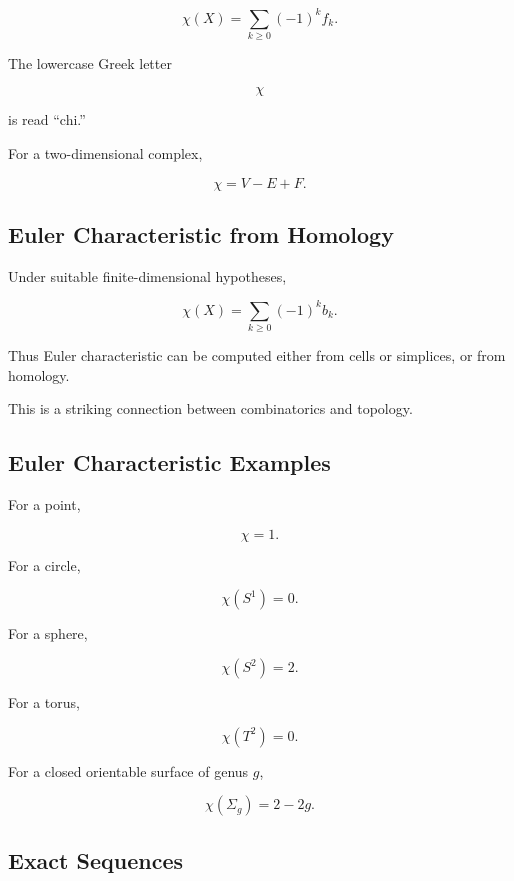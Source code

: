 \[
\boxed{
\chi(X)
=
\sum_{k\geq0}
(-1)^k f_k.
}
\]

The lowercase Greek letter

\[
\chi
\]

is read ``chi.''

For a two-dimensional complex,

\[
\boxed{
\chi
=
V-E+F.
}
\]

\subsection{Euler Characteristic from Homology}
\label{subsec:euler-characteristic-homology}

Under suitable finite-dimensional hypotheses,

\[
\boxed{
\chi(X)
=
\sum_{k\geq0}
(-1)^k b_k.
}
\]

Thus Euler characteristic can be computed either from cells or simplices,
or from homology.

This is a striking connection between combinatorics and topology.

\subsection{Euler Characteristic Examples}
\label{subsec:euler-characteristic-examples}

For a point,

\[
\boxed{
\chi=1.
}
\]

For a circle,

\[
\boxed{
\chi(S^1)=0.
}
\]

For a sphere,

\[
\boxed{
\chi(S^2)=2.
}
\]

For a torus,

\[
\boxed{
\chi(T^2)=0.
}
\]

For a closed orientable surface of genus \(g\),

\[
\boxed{
\chi(\Sigma_g)
=
2-2g.
}
\]

\subsection{Exact Sequences}
\label{subsec:exact-sequences-topology}

